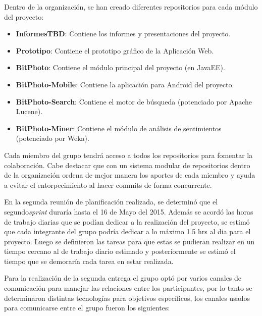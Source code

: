 \documentclass{memoria}
\begin{document}
Dentro de la organización, se han creado diferentes repositorios para cada módulo del proyecto:

\begin{itemize}
	\item \textbf{InformesTBD}: Contiene los informes y presentaciones del proyecto. 
	\item \textbf{Prototipo}: Contiene el prototipo gráfico de la Aplicación Web.
	\item \textbf{BitPhoto}: Contiene el módulo principal del proyecto (en JavaEE).
	\item \textbf{BitPhoto-Mobile}: Contiene la aplicación para Android del proyecto.
	\item \textbf{BitPhoto-Search}: Contiene el motor de búsqueda (potenciado por Apache Lucene).
	\item \textbf{BitPhoto-Miner}: Contiene el módulo de análisis de sentimientos (potenciado por Weka).
\end{itemize}

Cada miembro del grupo tendrá acceso a todos los repositorios para fomentar la colaboración. Cabe destacar que con un sistema modular de repositorios dentro de la organización ordena de mejor manera los aportes de cada miembro y ayuda a evitar el entorpecimiento al hacer commits de forma concurrente.

\newpage


En la segunda reunión de planificación realizada, se determinó que el segundo\textsl{sprint} duraría hasta el 16 de Mayo del 2015. Además se acordó las horas de trabajo diarias que se podían dedicar a la realización del proyecto, se estimó que cada integrante del grupo podría dedicar a lo máximo 1.5 hrs al dia para el proyecto. Luego se definieron las tareas para que estas se pudieran realizar en un tiempo cercano al de trabajo diario estimado y posteriormente se estimó el tiempo que se demoraría cada tarea en estar realizada.

Para la realización de la segunda entrega el grupo optó por varios canales de comunicación para manejar las relaciones entre los participantes, por lo tanto se determinaron distintas tecnologías para objetivos específicos, los canales usados para comunicarse entre el grupo fueron los siguientes:
\end{document}
